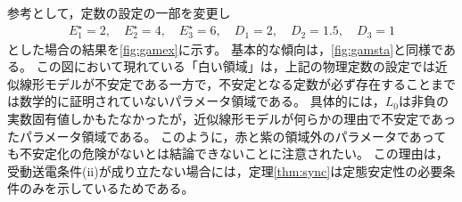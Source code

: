 \documentclass[tombow,dvipdfmx]{corona-a5-1.1}
\begin{document}
\begin{例}[受動送電条件に基づく定態安定性解析]
参考として，定数の設定の一部を変更し
\begin{align*}
E_1^{\star}=2
,\quad
E_2^{\star}=4
,\quad
E_3^{\star}=6
,\quad
D_1 = 2
,\quad
D_2 = 1.5
,\quad
D_3 = 1
\end{align*}
とした場合の結果を\ref{fig:gamex}に示す。
基本的な傾向は，\ref{fig:gamsta}と同様である。
この図において現れている「白い領域」は，上記の物理定数の設定では近似線形モデルが不安定である一方で，不安定となる定数が必ず存在することまでは数学的に証明されていないパラメータ領域である。
具体的には，$L_0$は非負の実数固有値しかもたなかったが，近似線形モデルが何らかの理由で不安定であったパラメータ領域である。
このように，赤と紫の領域外のパラメータであっても不安定化の危険がないとは結論できないことに注意されたい。
この理由は，受動送電条件(ii)が成り立たない場合には，定理\ref{thm:sync}は定態安定性の必要条件のみを示しているためである。
\end{例}






\newpage
\end{document}
